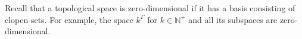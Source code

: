 \documentclass[11pt,reqno,psamsfonts]{amsart}
\theoremstyle{bfnote}
\theoremstyle{definition}
\theoremstyle{remark}
\newcommand{\0}{\varnothing}
\newcommand{\emphd}[1]{{\fontseries{b}\selectfont\textsf{#1}}}
\newcommand{\acts}{\mathrel{\reflectbox{$\righttoleftarrow$}}}
\newcommand{\G}{\Gamma}
\newcommand{\N}{\mathbb{N}}
\newcommand{\sr}{amply syndetic\xspace}
\numberwithin{equation}{section}
\begin{document}

    Recall that a topological space is \emphd{zero-dimensional} if it has a basis consisting of clopen sets. For example, the space $k^\G$ for $k \in \N^+$ and all its subspaces are zero-dimensional.
    
\end{document}
